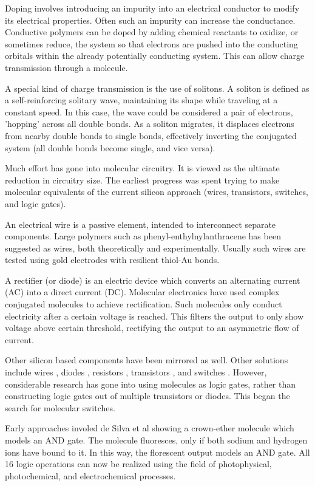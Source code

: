 \documentclass[12pt]{article}
\begin{document}
Doping involves introducing an impurity into an electrical conductor to modify its electrical properties. Often such an impurity can increase the conductance. Conductive polymers can be doped by adding chemical reactants to oxidize, or sometimes reduce, the system so that electrons are pushed into the conducting orbitals within the already potentially conducting system. This can allow charge transmission through a molecule. 

A special kind of charge transmission is the use of solitons. A soliton is defined as a self-reinforcing solitary wave, maintaining its shape while traveling at a constant speed. In this case, the wave could be considered a pair of electrons, 'hopping' across all double bonds. As a soliton migrates, it displaces electrons from nearby double bonds to single bonds, effectively inverting the conjugated system (all double bonds become single, and vice versa).

Much effort has gone into molecular circuitry. It is viewed as the ultimate reduction in circuitry size. The earliest progress was spent trying to make molecular equivalents of the current silicon approach (wires, transistors, switches, and logic gates). 

An electrical wire is a passive element, intended to interconnect separate components. Large polymers such as phenyl-enthylnylanthracene has been suggested as wires, both theoretically and experimentally. Usually such wires are tested using gold electrodes with resilient thiol-Au bonds. 

A rectifier (or diode) is an electric device which converts an alternating current (AC) into a direct current (DC). Molecular electronics have used complex conjugated molecules to achieve rectification. Such molecules only conduct electricity after a certain voltage is reached. This filters the output to only show voltage above certain threshold, rectifying the output to an asymmetric flow of current. 

Other silicon based components have been mirrored as well. Other solutions include wires \cite{9}, diodes \cite{10,11}, resistors \cite{12,13}, transistors \cite{14, 15, 16, 17}, and switches \cite{18, 19}. However, considerable research has gone into using molecules as logic gates, rather than constructing logic gates out of multiple transistors or diodes. This began the search for molecular switches. 

Early approaches involed de Silva et al showing a crown-ether molecule which models an AND gate. The molecule fluoresces, only if both sodium and hydrogen ions have bound to it. In this way, the florescent output models an AND gate. All 16 logic operations can now be realized using the field of photophysical, photochemical, and electrochemical processes. 
\end{document}
